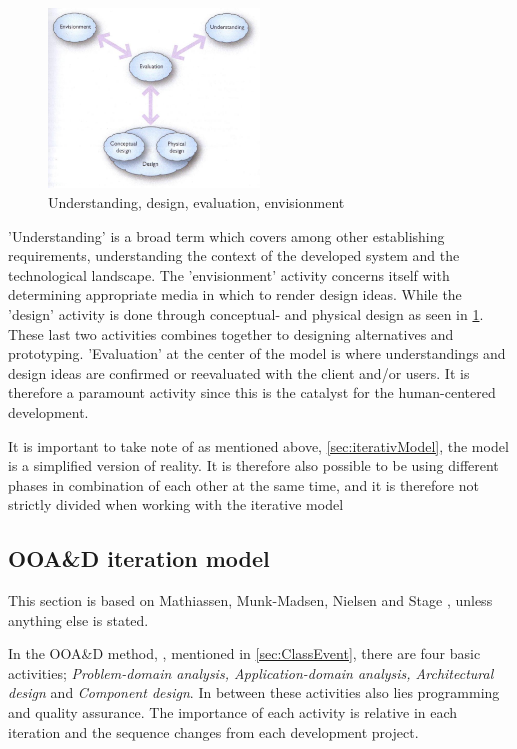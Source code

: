 \begin{figure}[H]
	\centering
	\includegraphics[width=0.5\textwidth]{billeder/DEBModel.jpg}
	\caption{Understanding, design, evaluation, envisionment \citep[p.~49]{Benyon}}\label{fig:DEBModel}
\end{figure}
'Understanding' is a broad term which covers among other establishing requirements, understanding the context of the developed system and the technological landscape.
The 'envisionment' activity concerns itself with determining appropriate media in which to render design ideas.
While the 'design' activity is done through conceptual- and physical design as seen in \cref{fig:DEBModel}.
These last two activities combines together to designing alternatives and prototyping.
'Evaluation' at the center of the model is where understandings and design ideas are confirmed or reevaluated with the client and/or users.
It is therefore a paramount activity since this is the catalyst for the human-centered development.

It is important to take note of as mentioned above, \cref{sec:iterativModel}, the model is a simplified version of reality.
It is therefore also possible to be using different phases in combination of each other at the same time, and it is therefore not strictly divided when working with the iterative model

\subsection{OOA\&D iteration model}\label{sec:Iterative3}
This section is based on Mathiassen, Munk-Madsen, Nielsen and Stage \cite{Rod-Aalborg}, unless anything else is stated.

In the OOA\&D method, \cite{Rod-Aalborg}, mentioned in \cref{sec:ClassEvent},  there are four basic activities; \textit{Problem-domain analysis, Application-domain analysis, Architectural design} and \textit{Component design}.
In between these activities  also lies programming and quality assurance.
The importance of each activity is relative in each iteration and the sequence changes from each development project.

